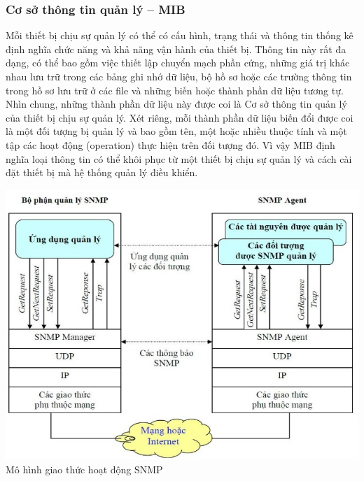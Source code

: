 \documentclass[12pt,oneside,a4paper,reqno]{report}
\begin{document}
\begin{large}
\subsubsection{Cơ sở thông tin quản lý – MIB}

Mỗi thiết bị chịu sự quản lý có thể có cấu hình, trạng thái và thông tin thống kê định nghĩa chức năng và khả năng vận hành của thiết bị. Thông tin này rất đa dạng, có thể bao gồm việc thiết lập chuyển mạch phần cứng, những giá trị khác nhau lưu trữ trong các bảng ghi nhớ dữ liệu, bộ hồ sơ hoặc các trường thông tin trong hồ sơ lưu trữ ở các file và những biến hoặc thành phần dữ liệu tương tự. Nhìn chung, những thành phần dữ liệu này được coi là Cơ sở thông tin quản lý của thiết bị chịu sự quản lý. Xét riêng, mỗi thành phần dữ liệu biến đổi được coi là một đối tượng bị quản lý và bao gồm tên, một hoặc nhiều thuộc tính và một tập các hoạt động (operation) thực hiện trên đối tượng đó. Vì vậy MIB định nghĩa loại thông tin có thể khôi phục từ một thiết bị chịu sự quản lý và cách cài đặt thiết bị mà hệ thống quản lý điều khiển. 

\begin{center}
	\includegraphics[scale=0.8]{images/giaotiepsnmp2.jpg}\\
	Mô hình giao thức hoạt động SNMP
\end{center}


\end{large}
\end{document}
